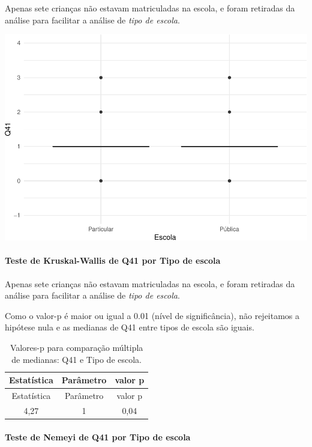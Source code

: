 \documentclass[]{article}
\let\oldparagraph\paragraph
\renewcommand{\paragraph}[1]{\oldparagraph{#1}\mbox{}}
\begin{document}
Apenas sete crianças não estavam matriculadas na escola, e foram retiradas da análise para facilitar a análise de \emph{tipo de escola}.

\begin{center}\includegraphics[width=0.75\linewidth]{relatorio_covid19_files/figure-latex/unnamed-chunk-1650-1} \end{center}

\hypertarget{teste-de-kruskal-wallis-de-q41-por-tipo-de-escola}{%
\paragraph{Teste de Kruskal-Wallis de Q41 por Tipo de escola}\label{teste-de-kruskal-wallis-de-q41-por-tipo-de-escola}}

Apenas sete crianças não estavam matriculadas na escola, e foram retiradas da análise para facilitar a análise de \emph{tipo de escola}.

Como o valor-p é maior ou igual a 0.01 (nível de significância), não rejeitamos a hipótese nula e as medianas de Q41 entre tipos de escola são iguais.

\begin{longtable}[]{@{}ccc@{}}
\caption{\label{tab:unnamed-chunk-1652}Valores-p para comparação múltipla de medianas: Q41 e Tipo de escola.}\tabularnewline
\toprule
Estatística & Parâmetro & valor p\tabularnewline
\midrule
\endfirsthead
\toprule
Estatística & Parâmetro & valor p\tabularnewline
\midrule
\endhead
4,27 & 1 & 0,04\tabularnewline
\bottomrule
\end{longtable}

\hypertarget{teste-de-nemeyi-de-q41-por-tipo-de-escola}{%
\paragraph{Teste de Nemeyi de Q41 por Tipo de escola}\label{teste-de-nemeyi-de-q41-por-tipo-de-escola}}
\end{document}

